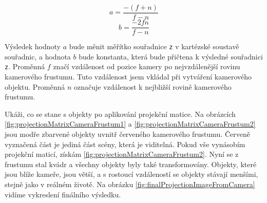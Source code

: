 \documentclass[czech,bachelor,dept420,male,cpdeclaration]{diploma}
\begin{document}
$$a = \frac{-\left(f+n\right)}{f-n}$$ 
$$b = \frac{-2fn}{f-n}$$ 

Výsledek hodnoty $a$ bude měnit měřítko souřadnice \texttt{z} v kartézské soustavě souřadnic, a hodnota $b$ bude konstanta, která bude přičtena k výsledné souřadnici \texttt{z}. Proměnná $f$ značí vzdálenost od pozice kamery po nejvzdálenější rovinu kamerového frustumu. Tuto vzdálenost jsem vkládal při vytváření kamerového objektu. Proměnná $n$ označuje vzdálenost k nejbližší rovině kamerového frustumu. 

Ukáži, co se stane s objekty po aplikování projekční matice. Na obrázcích \ref{fig:projectionMatrixCameraFrustum1} a \ref{fig:projectionMatrixCameraFrustum2} jsou modře zbarvené objekty uvnitř červeného kamerového frustumu. Červeně vyznačená část je jediná část scény, která je viditelná. Pokud vše vynásobím projekční maticí, získám \ref{fig:projectionMatrixCameraFrustum2}. Nyní se z frustumu stal kvádr a všechny objekty byly také transformovány. Objekty, které jsou blíže kameře, jsou větší, a s rostoucí vzdáleností se objekty stávají menšími, stejně jako v reálném životě. Na obrázku \ref{fig:finalProjectionImageFromCamera} vidíme vykreslení finálního výsledku. 
\end{document}

